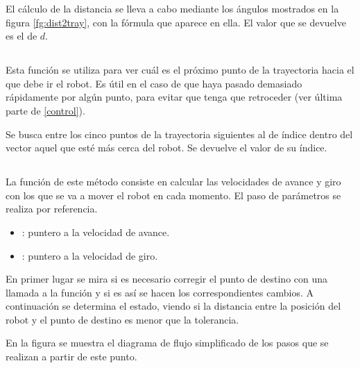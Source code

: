 \noindent
El cálculo de la distancia se lleva a cabo mediante los ángulos mostrados en la figura \ref{fg:dist2tray}, con la fórmula que aparece en ella. El valor que se devuelve es el de $d$.

\subsection{}

\noindent
{}

\noindent
Esta función se utiliza para ver cuál es el próximo punto de la trayectoria hacia el que debe ir el robot. Es útil en el caso de que haya pasado demasiado rápidamente por algún punto, para evitar que tenga que retroceder (ver última parte de \ref{control}).

\noindent
Se busca entre los cinco puntos de la trayectoria siguientes al de índice  dentro del vector  aquel que esté más cerca del robot. Se devuelve el valor de su índice.

\subsection{}

\noindent
{}

\noindent
La función de este método consiste en calcular las velocidades de avance y giro con los que se va a mover el robot en cada momento. El paso de parámetros se realiza por referencia.

\begin{itemize}
  \item {}: puntero a la velocidad de avance.
  \item {}: puntero a la velocidad de giro.
\end{itemize}

\noindent
En primer lugar se mira si es necesario corregir el punto de destino con una llamada a la función  y si es así se hacen los correspondientes cambios. A continuación se determina el estado, viendo si la distancia entre la posición del robot y el punto de destino es menor que la tolerancia.

En la figura se muestra el diagrama de flujo simplificado de los pasos que se realizan a partir de este punto.

